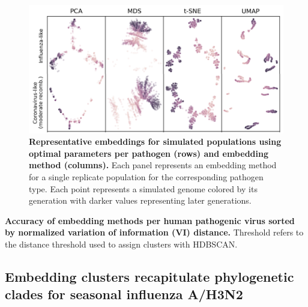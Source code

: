 \documentclass[10pt,letterpaper]{article}
\begin{document}
\begin{figure}[!h]
\includegraphics[width=\columnwidth]{figures/simulated-populations-representative-embeddings.png}
\caption{{\bf Representative embeddings for simulated populations using optimal parameters per pathogen (rows) and embedding method (columns).}
  Each panel represents an embedding method for a single replicate population for the corresponding pathogen type.
  Each point represents a simulated genome colored by its generation with darker values representing later generations.}
\label{fig:simulated-populations-representative-embeddings}
\end{figure}

\begin{table}[!ht]
\centering
\caption{
  {\bf Accuracy of embedding methods per human pathogenic virus sorted by normalized variation of information (VI) distance.}
  Threshold refers to the distance threshold used to assign clusters with HDBSCAN.}

\label{table:accuracy}
\end{table}

\subsection*{Embedding clusters recapitulate phylogenetic clades for seasonal influenza A/H3N2}
\end{document}
